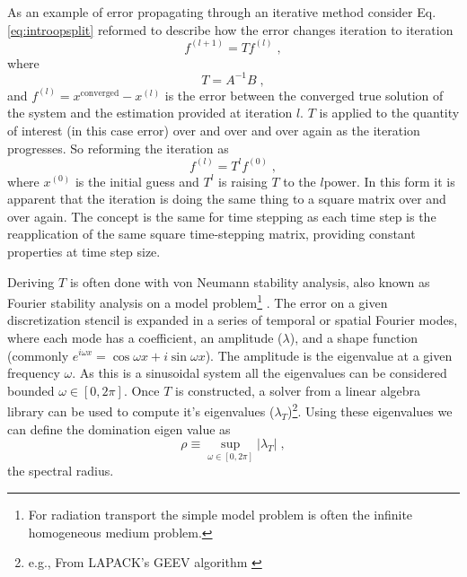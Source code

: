 As an example of error propagating through an iterative method consider Eq. \eqref{eq:introopsplit} reformed to describe how the error changes iteration to iteration
\begin{equation}
    f^{(l+1)} = {T}f^{(l)} \; ,
\end{equation}
where
\begin{equation}
    {T} =   A^{-1}B \;,  %
\end{equation}
and $f^{(l)} = x^{\text{converged}} - x^{(l)}$ is the error between the converged true solution of the system and the estimation provided at iteration $l$.
${T}$ is applied to the quantity of interest (in this case error) over and over and over again as the iteration progresses.
So reforming the iteration as
\begin{equation}
    f^{(l)} = {T}^{l}f^{(0)} \; ,
\end{equation}
where $x^{(0)}$ is the initial guess and ${T}^{l}$ is raising ${T}$ to the $l$\ths power.
In this form it is apparent that the iteration is doing the same thing to a square matrix over and over again.
The concept is the same for time stepping as each time step is the reapplication of the same square time-stepping matrix, providing constant properties at time step size.

Deriving $T$ is often done with von Neumann stability analysis, also known as Fourier stability analysis on a model problem\footnote{For radiation transport the simple model problem is often the infinite homogeneous medium problem.} \cite{leveque2007finite}.
The error on a given discretization stencil is expanded in a series of temporal or spatial Fourier modes, where each mode has a coefficient, an amplitude ($\lambda$), and a shape function (commonly $e^{i\omega x}=\cos{\omega x} + i\sin{\omega x}$).
The amplitude is the eigenvalue at a given frequency $\omega$.
As this is a sinusoidal system all the eigenvalues can be considered bounded $\omega \in [0, 2\pi]$.
Once $T$ is constructed, a solver from a linear algebra library can be used to compute it's eigenvalues ($\lambda_T$)\footnote{e.g., From LAPACK's GEEV algorithm \cite{laug}}.
Using these eigenvalues we can define the domination eigen value as
\begin{equation}
    \rho \equiv \sup_{\omega\in[0,2\pi]}\left|\lambda_T\right| \; ,
\end{equation}
the spectral radius.

